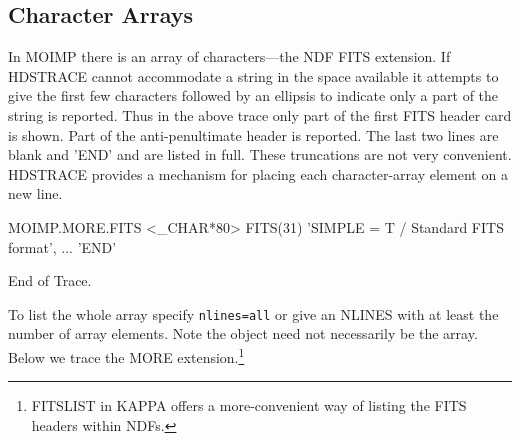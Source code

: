 \documentclass[11pt,nolof]{starlink}
\begin{document}
\subsection{Character Arrays}

In MOIMP there is an array of characters---the NDF FITS extension. If
{\footnotesize HDSTRACE} cannot accommodate a string in the space
available it attempts to give the first few characters followed by an
ellipsis to indicate only a part of the string is reported.  Thus in the
above trace only part of the first FITS header card is shown.  Part of
the anti-penultimate header is reported.  The last two lines are blank
and 'END' and are listed in full.  These truncations are not very
convenient. {\footnotesize HDSTRACE} provides a mechanism for placing
each character-array element on a new line.

\small
\begin{terminalv}

MOIMP.MORE.FITS  <_CHAR*80>
  FITS(31)
   'SIMPLE  =                    T / Standard FITS format', ...
   'END'

End of Trace.
\end{terminalv}
\normalsize
To list the whole array specify \texttt{nlines=all} or give an NLINES with at
least the number of array elements.  Note the object need not
necessarily be the array.  Below we trace the MORE extension.\footnote{
FITSLIST in {\footnotesize KAPPA} offers a more-convenient way of listing the
FITS headers within NDFs.}
\end{document}
